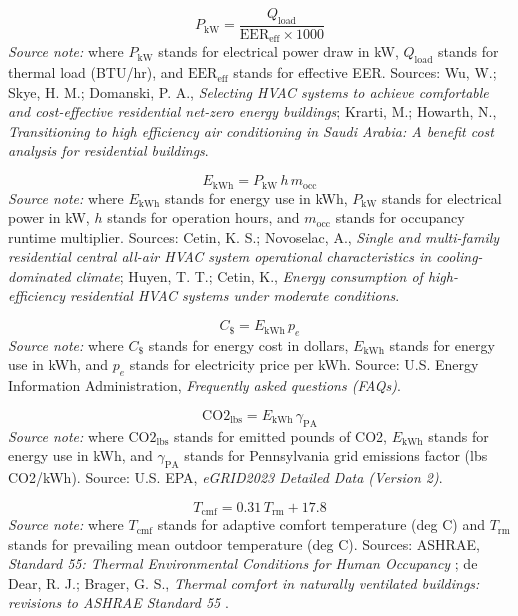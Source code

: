 \documentclass[12pt]{article}
\begin{document}
\begin{equation}
\label{eq:hvac_kw}
P_{\mathrm{kW}} = \frac{Q_{\mathrm{load}}}{\mathrm{EER}_{\mathrm{eff}}\times 1000}
\end{equation}
\noindent\textit{Source note:} where $P_{\mathrm{kW}}$ stands for electrical power draw in kW, $Q_{\mathrm{load}}$ stands for thermal load (BTU/hr), and $\mathrm{EER}_{\mathrm{eff}}$ stands for effective EER. Sources: Wu, W.; Skye, H. M.; Domanski, P. A., \emph{Selecting HVAC systems to achieve comfortable and cost-effective residential net-zero energy buildings}; Krarti, M.; Howarth, N., \emph{Transitioning to high efficiency air conditioning in Saudi Arabia: A benefit cost analysis for residential buildings}.

\begin{equation}
\label{eq:hvac_kwh_total}
E_{\mathrm{kWh}} = P_{\mathrm{kW}}\,h\,m_{\mathrm{occ}}
\end{equation}
\noindent\textit{Source note:} where $E_{\mathrm{kWh}}$ stands for energy use in kWh, $P_{\mathrm{kW}}$ stands for electrical power in kW, $h$ stands for operation hours, and $m_{\mathrm{occ}}$ stands for occupancy runtime multiplier. Sources: Cetin, K. S.; Novoselac, A., \emph{Single and multi-family residential central all-air HVAC system operational characteristics in cooling-dominated climate}; Huyen, T. T.; Cetin, K., \emph{Energy consumption of high-efficiency residential HVAC systems under moderate conditions}.

\begin{equation}
\label{eq:hvac_cost}
C_{\$} = E_{\mathrm{kWh}}\,p_e
\end{equation}
\noindent\textit{Source note:} where $C_{\$}$ stands for energy cost in dollars, $E_{\mathrm{kWh}}$ stands for energy use in kWh, and $p_e$ stands for electricity price per kWh. Source: U.S. Energy Information Administration, \emph{Frequently asked questions (FAQs)}.

\begin{equation}
\label{eq:hvac_emissions}
\mathrm{CO2}_{\mathrm{lbs}} = E_{\mathrm{kWh}}\,\gamma_{\mathrm{PA}}
\end{equation}
\noindent\textit{Source note:} where $\mathrm{CO2}_{\mathrm{lbs}}$ stands for emitted pounds of CO2, $E_{\mathrm{kWh}}$ stands for energy use in kWh, and $\gamma_{\mathrm{PA}}$ stands for Pennsylvania grid emissions factor (lbs CO2/kWh). Source: U.S. EPA, \emph{eGRID2023 Detailed Data (Version 2)}.

\begin{equation}
\label{eq:hvac_adaptive_comfort}
T_{\mathrm{cmf}} = 0.31\,T_{\mathrm{rm}} + 17.8
\end{equation}
\noindent\textit{Source note:} where $T_{\mathrm{cmf}}$ stands for adaptive comfort temperature (deg C) and $T_{\mathrm{rm}}$ stands for prevailing mean outdoor temperature (deg C). Sources: ASHRAE, \emph{Standard 55: Thermal Environmental Conditions for Human Occupancy} \cite{ashrae55}; de Dear, R. J.; Brager, G. S., \emph{Thermal comfort in naturally ventilated buildings: revisions to ASHRAE Standard 55} \cite{dedear2002}.
\end{document}
